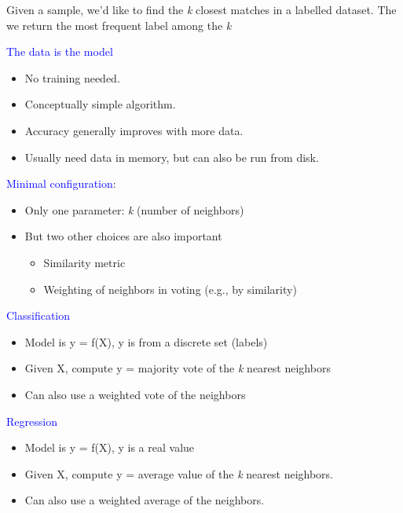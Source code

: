 \documentclass[11pt]{article}
\begin{document}
Given a sample, we'd like to find the \textit{k} closest matches in a labelled dataset. The we return the most frequent label among the \textit{k} \\

\noindent
\begin{minipage}[t]{.5\textwidth}
\raggedright

\textcolor{blue}{The data is the model}
\begin{itemize}
	\item No training needed.
	\item Conceptually simple algorithm.
	\item Accuracy generally improves with more data.
	\item Usually need data in memory, but can also be run from disk. \\
\end{itemize}

\textcolor{blue}{Minimal configuration}:
\begin{itemize}
	\item Only one parameter: \textit{k} (number of neighbors)
	\item But two other choices are also important
		\begin{itemize}
			\item Similarity metric
			\item Weighting of neighbors in  voting (e.g., by similarity)
		\end{itemize}
\end{itemize}
\end{minipage}%
\begin{minipage}[t]{.5\textwidth}
\raggetleft
\textcolor{blue}{Classification}
\begin{itemize}
	\item Model is y = f(X), y is from a discrete set (labels)
	\item Given X, compute y = majority vote of the \textit{k} nearest neighbors
	\item Can also use a weighted vote of the neighbors \\
\end{itemize}

\textcolor{blue}{Regression}
\begin{itemize}
	\item Model is y = f(X), y is a real value
	\item Given X, compute y = average value of the \textit{k} nearest neighbors.
	\item Can also use a weighted average of the neighbors.
\end{itemize}
\end{minipage}
\end{document}
